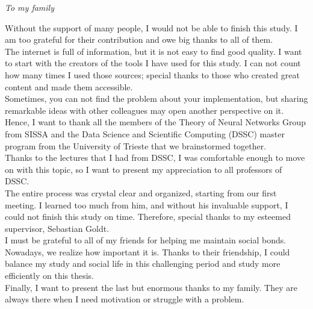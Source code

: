 \documentclass[a4paper, nobind]{templates/ociamthesis}
\begin{document}
\begin{romanpages}



\begin{dedication}
  \emph{To my family}
\end{dedication}

\begin{acknowledgements}
 	Without the support of many people, I would not be able to finish this study. I am too grateful for their contribution and owe big thanks to all of them.\\
The internet is full of information, but it is not easy to find good quality. I want to start with the creators of the tools I have used for this study. I can not count how many times I used those sources; special thanks to those who created great content and made them accessible.\\
Sometimes, you can not find the problem about your implementation, but sharing remarkable ideas with other colleagues may open another perspective on it. Hence, I want to thank all the members of the Theory of Neural Networks Group from SISSA and the Data Science and Scientific Computing (DSSC) master program from the University of Trieste that we brainstormed together.\\
Thanks to the lectures that I had from DSSC, I was comfortable enough to move on with this topic, so I want to present my appreciation to all professors of DSSC.\\
The entire process was crystal clear and organized, starting from our first meeting. I learned too much from him, and without his invaluable support, I could not finish this study on time. Therefore, special thanks to my esteemed supervisor, Sebastian Goldt.\\
I must be grateful to all of my friends for helping me maintain social bonds. Nowadays, we realize how important it is. Thanks to their friendship, I could balance my study and social life in this challenging period and study more efficiently on this thesis.\\
Finally, I want to present the last but enormous thanks to my family. They are always there when I need motivation or struggle with a problem.


\end{acknowledgements}
\end{romanpages}
\end{document}
